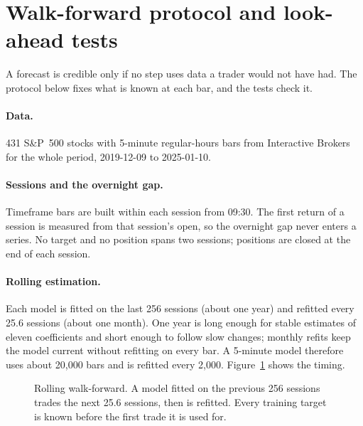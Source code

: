 \documentclass[11pt,a4paper]{article}
\begin{document}
\section{Walk-forward protocol and look-ahead tests}
\label{sec:protocol}

A forecast is credible only if no step uses data a trader would not have had. The protocol below fixes what is known at each bar, and the tests check it.


\paragraph{Data.} 431 S\&P~500 stocks with 5-minute regular-hours bars from Interactive Brokers for
the whole period, 2019-12-09 to 2025-01-10.

\paragraph{Sessions and the overnight gap.} Timeframe bars are built within each session from 09:30.
The first return of a session is measured from that session's open, so the overnight gap never enters a
series. No target and no position spans two sessions; positions are closed at the end of each session.

\paragraph{Rolling estimation.} Each model is fitted on the last 256 sessions (about one year)
and refitted every 25.6 sessions (about one month). One year is long enough for stable
estimates of eleven coefficients and short enough to follow slow changes; monthly refits keep the model
current without refitting on every bar. A 5-minute model therefore uses about 20{,}000 bars and is refitted
every 2{,}000. Figure~\ref{fig:wf} shows the timing.

\begin{figure}[htbp]
\centering
{}
\caption{Rolling walk-forward. A model fitted on the previous 256 sessions trades the next 25.6
sessions, then is refitted. Every training target is known before the first trade it is used for.}
\label{fig:wf}
\end{figure}
\end{document}

